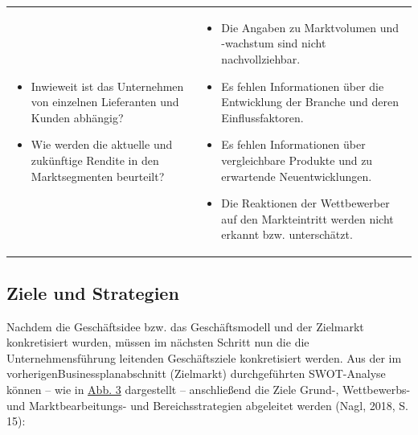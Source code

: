 \documentclass[
  letterpaper,
]{book}
\begin{document}
\begin{longtable}[]{@{}
  >{\raggedright\arraybackslash}p{}
  >{\raggedright\arraybackslash}p{}@{}}
\begin{minipage}[t]{\linewidth}
\begin{itemize}
  Unternehmens reagieren?
\item
  Inwieweit ist das Unternehmen von einzelnen Lieferanten und Kunden
  abhängig?
\item
  Wie werden die aktuelle und zukünftige Rendite in den Marktsegmenten
  beurteilt?
\end{itemize}
\end{minipage} & \begin{minipage}[t]{\linewidth}\raggedright
\begin{itemize}
\item
  Die Angaben zu Marktvolumen und -wachstum sind nicht nachvollziehbar.
\item
  Es fehlen Informationen über die Entwicklung der Branche und deren
  Einflussfaktoren.
\item
  Es fehlen Informationen über vergleichbare Produkte und zu erwartende
  Neuentwicklungen.
\item
  Die Reaktionen der Wettbewerber auf den Markteintritt werden nicht
  erkannt bzw. unterschätzt.
\end{itemize}
\end{minipage} \\
\end{longtable}

\subsection{Ziele und Strategien}\label{ziele-strategien}

Nachdem die Geschäftsidee bzw. das Geschäftsmodell und der Zielmarkt
konkretisiert wurden, müssen im nächsten Schritt nun die die
Unternehmensführung leitenden Geschäftsziele konkretisiert werden. Aus
der im vorherigenBusinessplanabschnitt (Zielmarkt) durchgeführten
SWOT-Analyse können -- wie in \hyperref[figure83]{Abb. 3} dargestellt --
anschließend die Ziele Grund-, Wettbewerbs- und Marktbearbeitungs- und
Bereichsstrategien abgeleitet werden (Nagl, 2018, S. 15):
\end{document}
